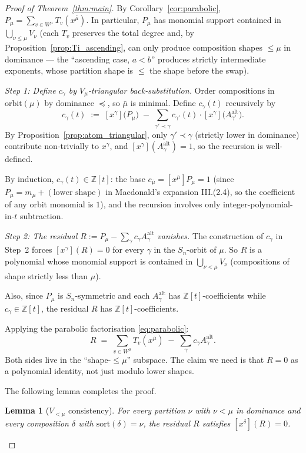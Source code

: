 \documentclass[11pt]{article}
\newtheorem{lemma}[theorem]{Lemma}
\theoremstyle{definition}
\begin{document}
\begin{proof}[Proof of Theorem~\ref{thm:main}]
By Corollary~\ref{cor:parabolic}, $P_\mu = \sum_{v \in W^\mu} T_v(x^{\bar\mu})$.
In particular, $P_\mu$ has monomial support contained in
$\bigcup_{\nu \le \mu} V_\nu$ (each $T_v$ preserves the total degree and,
by Proposition~\ref{prop:Ti_ascending}, can only produce composition shapes
$\le \mu$ in dominance --- the ``ascending case, $a < b$'' produces
strictly intermediate exponents, whose partition shape is $\le$ the shape
before the swap).

\emph{Step 1: Define $c_\gamma$ by $V_\mu$-triangular back-substitution.}
Order compositions in $\mathrm{orbit}(\mu)$ by dominance $\preceq$, so
$\bar\mu$ is minimal. Define $c_\gamma(t)$ recursively by
\[
c_\gamma(t) \;:=\; [x^\gamma]\bigl(P_\mu\bigr) \;-\;
\sum_{\gamma' \prec \gamma} c_{\gamma'}(t) \cdot [x^\gamma]\bigl(A^{\mathrm{alt}}_{\gamma'}\bigr).
\]
By Proposition~\ref{prop:atom_triangular}, only $\gamma' \prec \gamma$
(strictly lower in dominance) contribute non-trivially to $x^\gamma$, and
$[x^\gamma](A^{\mathrm{alt}}_\gamma) = 1$, so the recursion is well-defined.

By induction, $c_\gamma(t) \in \mathbb{Z}[t]$: the base
$c_{\bar\mu} = [x^{\bar\mu}]P_\mu = 1$ (since $P_\mu = m_\mu + (\text{lower shape})$
in Macdonald's expansion III.(2.4), so the coefficient of any orbit
monomial is $1$), and the recursion involves only integer-polynomial-in-$t$
subtraction.

\emph{Step 2: The residual $R := P_\mu - \sum_\gamma c_\gamma A^{\mathrm{alt}}_\gamma$
vanishes.}
The construction of $c_\gamma$ in Step~2 forces
$[x^\gamma](R) = 0$ for every $\gamma$ in the $S_n$-orbit of $\mu$.
So $R$ is a polynomial whose monomial support is contained in
$\bigcup_{\nu < \mu} V_\nu$ (compositions of shape strictly less than $\mu$).

Also, since $P_\mu$ is $S_n$-symmetric and each $A^{\mathrm{alt}}_\gamma$ has
$\mathbb{Z}[t]$-coefficients while $c_\gamma \in \mathbb{Z}[t]$, the
residual $R$ has $\mathbb{Z}[t]$-coefficients.

Applying the parabolic factorisation \eqref{eq:parabolic}:
\[
R \;=\; \sum_{v \in W^\mu} T_v(x^{\bar\mu}) \;-\; \sum_\gamma c_\gamma A^{\mathrm{alt}}_\gamma.
\]
Both sides live in the ``shape-$\le \mu$'' subspace. The claim we need is
that $R = 0$ as a polynomial identity, not just modulo lower shapes.

The following lemma completes the proof.

\begin{lemma}[$V_{<\mu}$ consistency]\label{lem:lower_shape}
For every partition $\nu$ with $\nu < \mu$ in dominance and every
composition $\delta$ with $\mathrm{sort}(\delta) = \nu$, the residual $R$
satisfies $[x^\delta](R) = 0$.
\end{lemma}


\end{proof}
\end{document}
